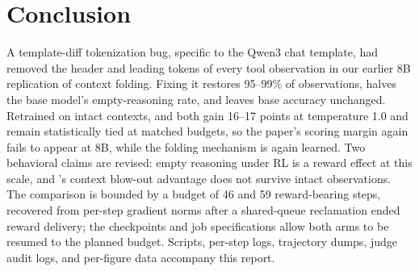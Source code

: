 \section{Conclusion}
\label{sec:conclusion}

A template-diff tokenization bug, specific to the Qwen3 chat template, had removed the header
and leading tokens of every tool observation in our earlier 8B replication of context folding.
Fixing it restores 95--99\% of observations, halves the base model's empty-reasoning rate,
and leaves base accuracy unchanged. Retrained on intact contexts, \foldgrpo{} and \grpo{} both
gain 16--17 points at temperature 1.0 and remain statistically tied at matched budgets, so the
paper's scoring margin again fails to appear at 8B, while the folding mechanism is again
learned. Two behavioral claims are revised: empty reasoning under RL is a reward effect at this
scale, and \foldgrpo{}'s context blow-out advantage does not survive intact observations. The
comparison is bounded by a budget of 46 and 59 reward-bearing steps, recovered from per-step
gradient norms after a shared-queue reclamation ended reward delivery; the checkpoints and
job specifications allow both arms to be resumed to the planned budget. Scripts, per-step logs,
trajectory dumps, judge audit logs, and per-figure data accompany this report.
